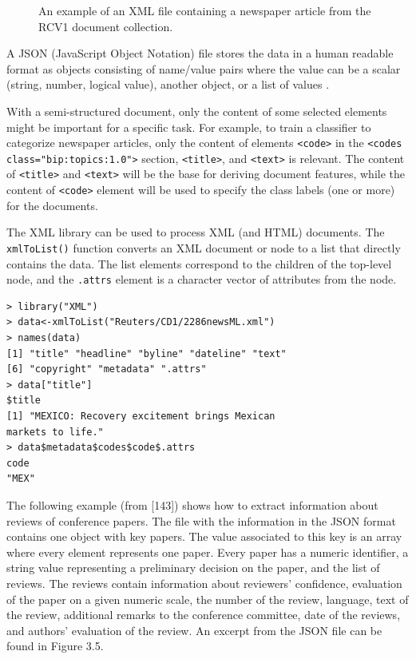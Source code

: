 \begin{figure}[H]
    \centering
    \caption{An example of an XML file containing a newspaper article from the RCV1 document collection.}
    \label{fig:placeholder34}
\end{figure}

A JSON (JavaScript Object Notation) file stores the data in a human readable
format as objects consisting of name/value pairs where the value can be a scalar
(string, number, logical value), another object, or a list of values \cite{ref79}.

With a semi-structured document, only the content of some selected elements
might be important for a specific task. For example, to train a classifier to categorize
newspaper articles, only the content of elements \texttt{<code>} in the 
\texttt{<codes class="bip:topics:1.0">} section, \texttt{<title>}, and \texttt{<text>} is relevant. 
The content of \texttt{<title>} and \texttt{<text>} will be the base for deriving 
document features, while the content of \texttt{<code>} element will be used to specify 
the class labels (one or more) for the documents.

The XML library can be used to process XML (and HTML) documents. The
\texttt{xmlToList()} function converts an XML document or node to a list that directly
contains the data. The list elements correspond to the children of the top-level
node, and the \texttt{.attrs} element is a character vector of attributes from the node.

\begin{verbatim}
> library("XML")
> data<-xmlToList("Reuters/CD1/2286newsML.xml")
> names(data)
[1] "title" "headline" "byline" "dateline" "text"
[6] "copyright" "metadata" ".attrs"
> data["title"]
$title
[1] "MEXICO: Recovery excitement brings Mexican
markets to life."
> data$metadata$codes$code$.attrs
code
"MEX"

\end{verbatim}

The following example (from [143]) shows how to extract information about
reviews of conference papers. The file with the information in the JSON format
contains one object with key papers. The value associated to this key is an array
where every element represents one paper. Every paper has a numeric identifier,
a string value representing a preliminary decision on the paper, and the list of
reviews. The reviews contain information about reviewers’ confidence, evaluation of the paper on a given numeric scale, the number of the review, language,
text of the review, additional remarks to the conference committee, date of the
reviews, and authors’ evaluation of the review. An excerpt from the JSON file
can be found in Figure 3.5.

